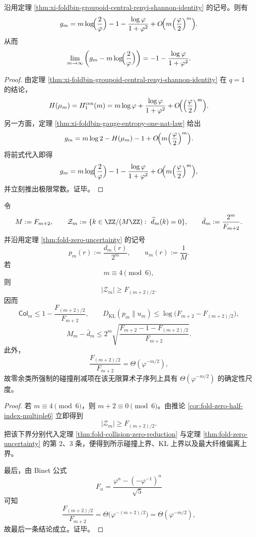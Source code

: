 \begin{theorem}[规范体积密度的精确热力学常数项]\label{thm:xi-foldbin-gauge-density-exact-thermodynamic-constant}
沿用定理 \ref{thm:xi-foldbin-groupoid-central-renyi-shannon-identity} 的记号。则有
\[
g_m
=
m\log\!\Bigl(\frac{2}{\varphi}\Bigr)
-1
-\frac{\log\varphi}{1+\varphi^2}
+O\!\Bigl(m\Bigl(\frac{\varphi}{2}\Bigr)^m\Bigr).
\]
从而
\[
\lim_{m\to\infty}
\left(
g_m-m\log\!\Bigl(\frac{2}{\varphi}\Bigr)
\right)
=
-1-\frac{\log\varphi}{1+\varphi^2}.
\]
\end{theorem}
\begin{proof}
由定理 \ref{thm:xi-foldbin-groupoid-central-renyi-shannon-identity} 在 \(q=1\) 的结论，
\[
H(\mu_m)=H_1^{\mathrm{cen}}(m)
=
m\log\varphi+\frac{\log\varphi}{1+\varphi^2}
+O\!\Bigl(\Bigl(\frac{\varphi}{2}\Bigr)^m\Bigr).
\]
另一方面，定理 \ref{thm:xi-foldbin-gauge-entropy-one-nat-law} 给出
\[
g_m
=
m\log 2-H(\mu_m)-1
+O\!\Bigl(m\Bigl(\frac{\varphi}{2}\Bigr)^m\Bigr).
\]
将前式代入即得
\[
g_m
=
m\log\!\Bigl(\frac{2}{\varphi}\Bigr)
-1
-\frac{\log\varphi}{1+\varphi^2}
+O\!\Bigl(m\Bigl(\frac{\varphi}{2}\Bigr)^m\Bigr),
\]
并立刻推出极限常数。证毕。
\end{proof}

\begin{theorem}[无限算术子序列上的零余类放大律]\label{thm:xi-fold-zero-arithmetic-subsequence-amplification}
令
\[
M:=F_{m+2},
\qquad
\mathcal Z_m:=\{k\in\ZZ/(M\ZZ):\ \widehat d_m(k)=0\},
\qquad
\bar d_m:=\frac{2^m}{F_{m+2}}.
\]
并沿用定理 \ref{thm:fold-zero-uncertainty} 的记号
\[
p_m(r):=\frac{d_m(r)}{2^m},
\qquad
u_m(r):=\frac1M.
\]
若
\[
m\equiv 4\pmod 6,
\]
则
\[
|\mathcal Z_m|\ge F_{(m+2)/2}.
\]
因而
\[
\mathsf{Col}_m
\le
1-\frac{F_{(m+2)/2}}{F_{m+2}},
\qquad
D_{\mathrm{KL}}(p_m\|u_m)
\le
\log\!\bigl(F_{m+2}-F_{(m+2)/2}\bigr),
\]
\[
M_m-\bar d_m
\le
2^m
\sqrt{
\frac{F_{m+2}-1-F_{(m+2)/2}}{F_{m+2}}
}.
\]
此外，
\[
\frac{F_{(m+2)/2}}{F_{m+2}}=\Theta(\varphi^{-m/2}),
\]
故零余类所强制的碰撞削减项在该无限算术子序列上具有 \(\Theta(\varphi^{-m/2})\) 的确定性尺度。
\end{theorem}
\begin{proof}
若 \(m\equiv 4\pmod 6\)，则 \(m+2\equiv 0\pmod 6\)。由推论 \ref{cor:fold-zero-half-index-multiple6} 立即得到
\[
|\mathcal Z_m|\ge F_{(m+2)/2}.
\]
把该下界分别代入定理 \ref{thm:fold-collision-zero-reduction} 与定理 \ref{thm:fold-zero-uncertainty} 的第 \(2\)、\(3\) 条，便得到所示碰撞上界、KL 上界以及最大纤维偏离上界。

最后，由 Binet 公式
\[
F_n=\frac{\varphi^n-(-\varphi^{-1})^n}{\sqrt5}
\]
可知
\[
\frac{F_{(m+2)/2}}{F_{m+2}}
=
\Theta\!\bigl(\varphi^{-(m+2)/2}\bigr)
=
\Theta(\varphi^{-m/2}),
\]
故最后一条结论成立。证毕。
\end{proof}

